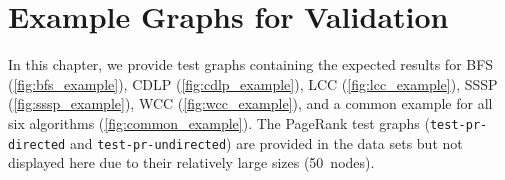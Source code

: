 \chapter{Example Graphs for Validation}
\label{chap:validation_examples}

In this chapter, we provide test graphs containing the expected results for
BFS (\autoref{fig:bfs_example}),
CDLP (\autoref{fig:cdlp_example}),
LCC (\autoref{fig:lcc_example}),
SSSP (\autoref{fig:sssp_example}),
WCC (\autoref{fig:wcc_example}),
and a common example for all six algorithms (\autoref{fig:common_example}).
The PageRank test graphs (\texttt{test-pr-directed} and \texttt{test-pr-undirected}) are provided in the data sets but not displayed here due to their relatively large sizes (50~nodes).

\newcommand{\examplescale}{0.48}

